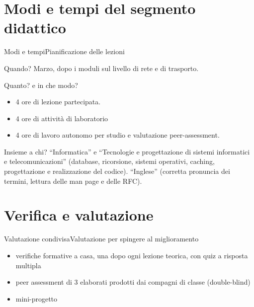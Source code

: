 \documentclass[italian]{beamer}
\begin{document}
\section[Modi e tempi]{Modi e tempi del segmento didattico}
\begin{frame}{Modi e tempi}{Pianificazione delle lezioni}
	
	\begin{block}{Quando?}
	Marzo, dopo i moduli sul livello di rete e di trasporto.
	\end{block}
	
	\begin{block}{Quanto? e in che modo?}
	\begin{itemize}
		\item 4 ore di lezione partecipata.
		\item 4 ore di attivit\`a di laboratorio
		\item 4 ore di lavoro autonomo per studio e valutazione peer-assessment.
	\end{itemize}
	\end{block}

	\begin{block}{Insieme a chi?}
		``\alert{Informatica}'' e ``\alert{Tecnologie e progettazione di sistemi informatici e telecomunicazioni}'' (database, ricorsione, sistemi operativi, caching, progettazione e realizzazione del codice). ``\alert{Inglese}'' (corretta pronuncia dei termini, lettura delle man page e delle RFC).
	\end{block}
\end{frame}


\section[Verifica e valutazione]{Verifica e valutazione}
\begin{frame}{Valutazione condivisa}{Valutazione per spingere al miglioramento}
	
	\begin{itemize}
		\item verifiche formative a casa, una dopo ogni lezione teorica, con quiz a risposta multipla
		\item peer assessment di 3 elaborati prodotti dai compagni di classe (double-blind)
		\item mini-progetto
	\end{itemize}
	
	\note{%
		
	}%
\end{frame}
\end{document}
